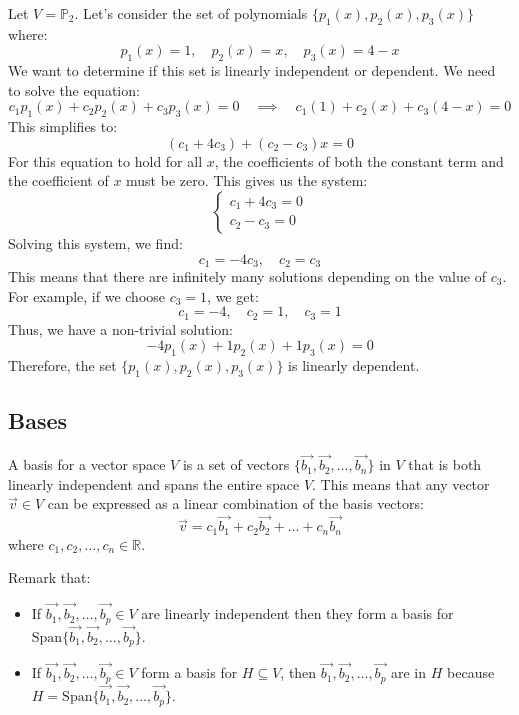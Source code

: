 \begin{eg}
    Let $V = \mathbb{P}_2$. Let's consider the set of polynomials $\{p_1(x), p_2(x), p_3(x)\}$ where:
    \[ p_1(x) = 1, \quad p_2(x) = x, \quad p_3(x) = 4 - x \]
    We want to determine if this set is linearly independent or dependent. We need to solve the equation:
    \[
        c_1 p_1(x) + c_2 p_2(x) + c_3 p_3(x) = 0 \quad \implies \quad c_1 (1) + c_2 (x) + c_3 (4 - x) = 0
    \]
    This simplifies to:
    \[ (c_1 + 4c_3) + (c_2 - c_3)x = 0 \]
    For this equation to hold for all $x$, the coefficients of both the constant term and the coefficient of $x$ must be zero. This gives us the system:
    \[ \begin{cases}
        c_1 + 4c_3 = 0 \\
        c_2 - c_3 = 0
    \end{cases} \]
    Solving this system, we find:
    \[ c_1 = -4c_3, \quad c_2 = c_3 \]
    This means that there are infinitely many solutions depending on the value of $c_3$. For example, if we choose $c_3 = 1$, we get:
    \[ c_1 = -4, \quad c_2 = 1, \quad c_3 = 1 \]
    Thus, we have a non-trivial solution:
    \[ -4p_1(x) + 1p_2(x) + 1p_3(x) = 0 \]
    Therefore, the set $\{p_1(x), p_2(x), p_3(x)\}$ is linearly dependent.
\end{eg}

\subsection{Bases}
\begin{definition}[Basis]
    A basis for a vector space $V$ is a set of vectors $\{\vec{b_1}, \vec{b_2}, \ldots, \vec{b_n}\}$ in $V$ that is both linearly independent and spans the entire space $V$. This means that any vector $\vec{v} \in V$ can be expressed as a linear combination of the basis vectors:
    \[ \vec{v} = c_1 \vec{b_1} + c_2 \vec{b_2} + \ldots + c_n \vec{b_n} \]
    where $c_1, c_2, \ldots, c_n \in \mathbb{R}$.
\end{definition}
Remark that:
\begin{itemize}[itemsep=1pt,label=$\circ$]
    \item If $\vec{b_1}, \vec{b_2}, \ldots, \vec{b_p} \in V$ are linearly independent then they form a basis for $\text{Span}\{\vec{b_1}, \vec{b_2}, \ldots, \vec{b_p}\}$.
    \item If $\vec{b_1}, \vec{b_2}, \ldots, \vec{b_p} \in V$ form a basis for $H \subseteq V$, then $\vec{b_1}, \vec{b_2}, \ldots, \vec{b_p}$ are in $H$ because $H = \text{Span}\{\vec{b_1}, \vec{b_2}, \ldots, \vec{b_p}\}$.
\end{itemize}

